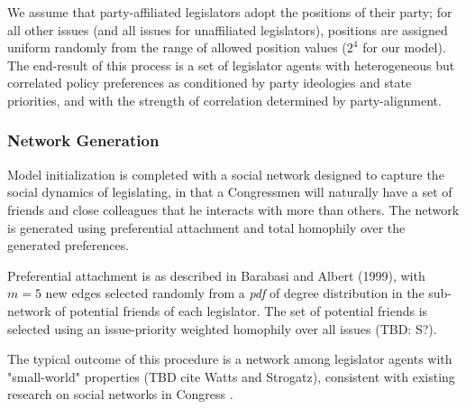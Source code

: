 \documentclass[pdftex,12pt,oribibl]{llncs}
\begin{document}
We assume that party-affiliated legislators adopt the positions of their party; for all other issues (and all issues for unaffiliated legislators), positions are assigned uniform randomly from the range of allowed position values ($2^4$ for our model).
The end-result of this process is a set of legislator agents with heterogeneous but correlated policy preferences as conditioned by party ideologies and state priorities, and with the strength of correlation determined by party-alignment.
\subsubsection{Network Generation}
Model initialization is completed with a social network designed to capture the social dynamics of legislating, in that a Congressmen will naturally have a set of friends and close colleagues that he interacts with more than others.
The network is generated using preferential attachment and total homophily over the generated preferences.

Preferential attachment is as described in Barabasi and Albert (1999), with $m=5$ new edges selected randomly from a \textit{pdf} of degree distribution in the sub-network of potential friends of each legislator.
The set of potential friends is selected using an issue-priority weighted homophily over all issues (TBD: S?).

The typical outcome of this procedure is a network among legislator agents with "small-world" properties (TBD cite Watts and Strogatz), consistent with existing research on social networks in Congress \parencite{Granovetter1978}.
\end{document}
